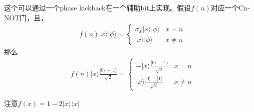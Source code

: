 这个可以通过一个phase kickback在一个辅助bit上实现。假设$f(n)$对应一个Cn-NOT门，且，
\begin{equation}
\begin{split}
&f(n)|x\rangle |\phi\rangle =\left\{\begin{array}{cc}  \sigma _x |x\rangle |\phi\rangle & x=n\\ |x\rangle|\phi\rangle & x\neq n \end{array}\right.
\end{split}
\end{equation}
那么
\begin{equation}
\begin{split}
&f(n)|x\rangle \frac{|0\rangle -|1\rangle}{\sqrt{2}} =\left\{\begin{array}{cc}  -|x\rangle \frac{|0\rangle -|1\rangle}{\sqrt{2}} & x=n\\ |x\rangle \frac{|0\rangle -|1\rangle}{\sqrt{2}} & x\neq n \end{array}\right.
\end{split}
\end{equation}

注意$f(x)=1-2|x\rangle \langle x|$
